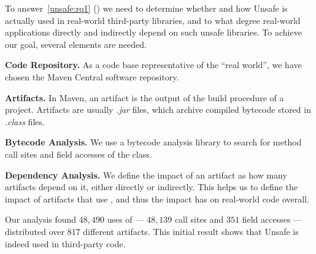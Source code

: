 To answer~\ref{unsafe:rq1} (\emph{\urqA})
we need to determine whether and how Unsafe is actually used in real-world third-party \java{} libraries,
and to what degree real-world applications directly and indirectly depend on such unsafe libraries.
To achieve our goal, several elements are needed.

\textbf{Code Repository.}
As a code base representative of the ``real world'',
we have chosen the Maven Central software repository.

\textbf{Artifacts.}
In Maven, an artifact is the output of the build procedure of a project.
Artifacts are usually \emph{.jar} files,
which archive compiled \java{} bytecode stored in \emph{.class} files.

\textbf{Bytecode Analysis.}
We use a bytecode analysis library to search for method call sites and field accesses of the  class.

\textbf{Dependency Analysis.}
We define the impact of an artifact as how many artifacts depend on it,
either directly or indirectly.
This helps us to define the impact of artifacts that use ,
and thus the impact  has on real-world code overall.





Our analysis found $48,490$ uses of  --- $48,139$ call sites and $351$ field accesses --- distributed over $817$ different artifacts.
This initial result shows that Unsafe is indeed used in third-party code.

